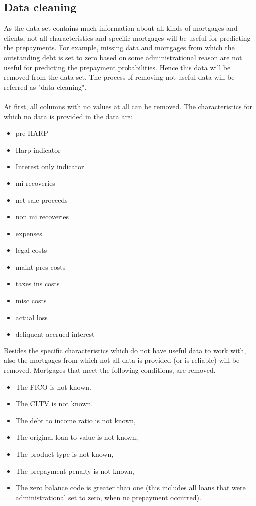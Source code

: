 \subsection{Data cleaning}
    As the data set contains much information about all kinds of mortgages 
    and clients, not all characteristics and specific mortgages will be 
    useful for predicting the prepayments. For example, missing data and 
    mortgages from which the outstanding debt is set to zero based on some 
    administrational reason are not useful for predicting the prepayment 
    probabilities. Hence this data will be removed from the data set. The 
    process of removing not useful data will be referred as "data cleaning". 
    \\\\  
    At first, all columns with no values at all can be removed. 
    The characteristics for which no data is provided in the data are: 
    \begin{itemize}
        \item pre-HARP
    	\item Harp indicator
    	\item Interest only indicator
        \item mi recoveries
        \item net sale proceeds
        \item non mi recoveries
        \item expenses
        \item legal costs
        \item maint pres costs
        \item taxes ins costs
        \item misc costs
        \item actual loss
        \item deliquent accrued interest
    \end{itemize}
    Besides the specific characteristics which do not have useful data 
    to work with, also the mortgages from which not all data is provided
    (or is reliable) will be removed. 
    Mortgages that meet the following conditions, are removed. 
    \begin{itemize}
        \item The FICO is not known.
        \item The CLTV is not known.
        \item The debt to income ratio is not known, 
        \item The original loan to value is not known, 
        \item The product type is not known, 
        \item The prepayment penalty is not known, 
        \item The zero balance code is greater than one (this 
        includes all loans that were administrational set to zero, 
        when no prepayment occurred).  
    \end{itemize}

